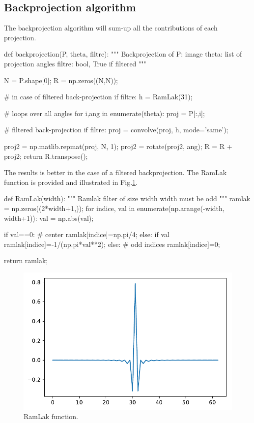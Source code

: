 \subsection{Backprojection algorithm}
The backprojection algorithm will sum-up all the contributions of each projection.

\begin{python}
def backprojection(P, theta, filtre):
    """
    Backprojection of
    P: image
    theta: list of projection angles
    filtre: bool, True if filtered
    """
    
    N = P.shape[0];
    R = np.zeros((N,N));
    
    # in case of filtered back-projection
    if filtre:
        h = RamLak(31);
    
    # loops over all angles
    for i,ang in enumerate(theta):
        proj = P[:,i];
        
        # filtered back-projection
        if filtre:
            proj = convolve(proj, h, mode='same');
        
        proj2 = np.matlib.repmat(proj, N, 1);
        proj2 = rotate(proj2, ang);
        R = R + proj2;
    return R.transpose();
\end{python}

The results is better in the case of a filtered backprojection. The RamLak function is provided and illustrated in Fig.\ref{fig:tomography:python:ramlak}.
\begin{python}
def RamLak(width):
    """
    Ramlak filter of size width
    width must be odd
    """
    ramlak = np.zeros((2*width+1,));
    for indice, val in enumerate(np.arange(-width, width+1)):
      val = np.abs(val);

      if val==0: # center
         ramlak[indice]=np.pi/4;
      else:
        if val%
            ramlak[indice]=-1/(np.pi*val**2);
        else: # odd indices
            ramlak[indice]=0;
    
    return ramlak;
\end{python}

\begin{figure}[htbp]
 \centering
 
 \includegraphics[width=.45\linewidth]{ramlak.pdf}
 
 \caption{RamLak function.}
 \label{fig:tomography:python:ramlak}
\end{figure}

